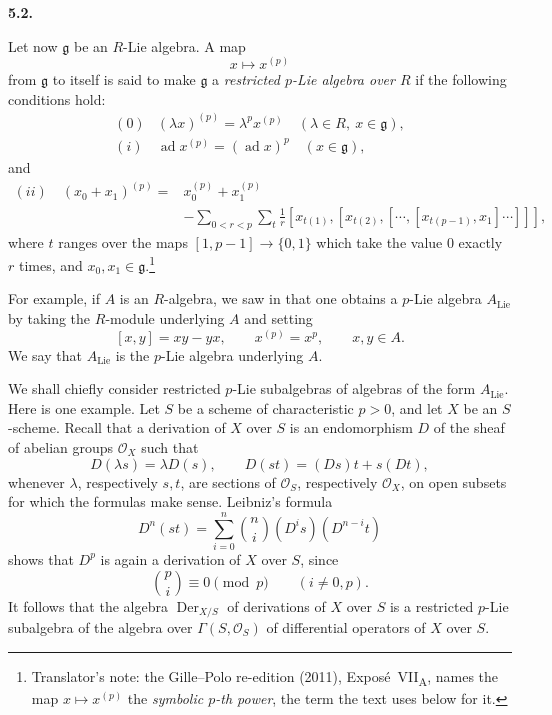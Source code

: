\medskip
\noindent\textbf{5.2.}
\label{sga3:VIIA:5.2}

Let now \(\mathfrak g\) be an \(R\)-Lie algebra. A map
\[
  x\longmapsto x^{(p)}
\]
from \(\mathfrak g\) to itself is said to make \(\mathfrak g\) a
\emph{restricted \(p\)-Lie algebra over \(R\)} if the following
conditions hold:
\[
\begin{array}{ll}
  (0) &
  (\lambda x)^{(p)}
  =
  \lambda^p x^{(p)}
  \quad
  (\lambda\in R,\ x\in\mathfrak g), \\[0.4em]
  (i) &
  \operatorname{ad}x^{(p)}
  =
  (\operatorname{ad}x)^p
  \quad
  (x\in\mathfrak g),
\end{array}
\]
and
\[
\begin{aligned}
  (ii)\quad
  (x_0+x_1)^{(p)}
  ={}&
  x_0^{(p)}+x_1^{(p)} \\
  &-
  \sum_{0<r<p}\sum_t\frac1r
  [x_{t(1)},
    [x_{t(2)},
      [\cdots,
        [x_{t(p-1)},x_1]
      \cdots]
    ]
  ],
\end{aligned}
\]
where \(t\) ranges over the maps
\([1,p-1]\to\{0,1\}\) which take the value \(0\) exactly \(r\)
times, and \(x_0,x_1\in\mathfrak g\).\footnote{Translator's note: the
Gille--Polo re-edition (2011), Expos\'e~VII\textsubscript{A}, names the
map \(x\mapsto x^{(p)}\) the \emph{symbolic \(p\)-th power}, the term the
text uses below for it.}

For example, if \(A\) is an \(R\)-algebra, we saw in  that one
obtains a \(p\)-Lie algebra \(A_{\mathrm{Lie}}\) by taking the
\(R\)-module underlying \(A\) and setting
\[
  [x,y]=xy-yx,
  \qquad
  x^{(p)}=x^p,
  \qquad
  x,y\in A.
\]
We say that \(A_{\mathrm{Lie}}\) is the \(p\)-Lie algebra underlying
\(A\).

We shall chiefly consider restricted \(p\)-Lie subalgebras of
algebras of the form \(A_{\mathrm{Lie}}\). Here is one example.
Let \(S\) be a scheme of characteristic \(p>0\), and let \(X\) be
an \(S\)-scheme. Recall that a derivation of \(X\) over \(S\) is
an endomorphism \(D\) of the sheaf of abelian groups
\(\mathcal O_X\) such that
\[
  D(\lambda s)=\lambda D(s),
  \qquad
  D(st)=(Ds)t+s(Dt),
\]
whenever \(\lambda\), respectively \(s,t\), are sections of
\(\mathcal O_S\), respectively \(\mathcal O_X\), on open subsets
for which the formulas make sense. Leibniz's formula
\[
  D^n(st)
  =
  \sum_{i=0}^n
  \binom ni
  (D^is)(D^{n-i}t)
\]
shows that \(D^p\) is again a derivation of \(X\) over \(S\), since
\[
  \binom pi\equiv0\pmod p
  \qquad(i\ne0,p).
\]
It follows that the algebra \(\operatorname{Der}_{X/S}\) of
derivations of \(X\) over \(S\) is a restricted \(p\)-Lie subalgebra of
the algebra over \(\Gamma(S,\mathcal O_S)\) of differential operators of
\(X\) over \(S\).

